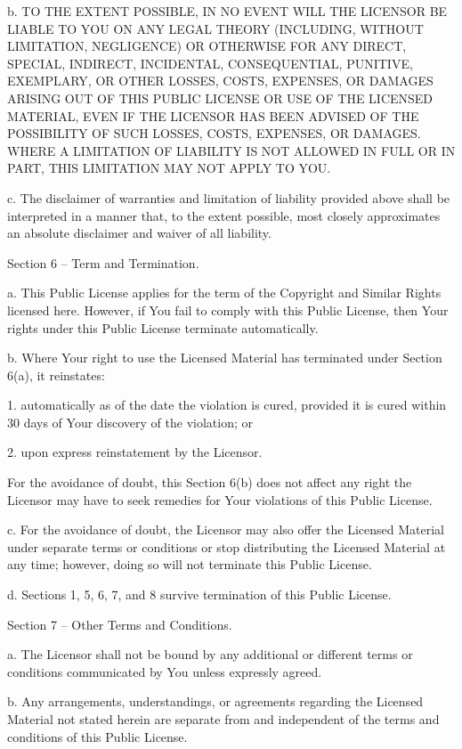   b. TO THE EXTENT POSSIBLE, IN NO EVENT WILL THE LICENSOR BE LIABLE
     TO YOU ON ANY LEGAL THEORY (INCLUDING, WITHOUT LIMITATION,
     NEGLIGENCE) OR OTHERWISE FOR ANY DIRECT, SPECIAL, INDIRECT,
     INCIDENTAL, CONSEQUENTIAL, PUNITIVE, EXEMPLARY, OR OTHER LOSSES,
     COSTS, EXPENSES, OR DAMAGES ARISING OUT OF THIS PUBLIC LICENSE OR
     USE OF THE LICENSED MATERIAL, EVEN IF THE LICENSOR HAS BEEN
     ADVISED OF THE POSSIBILITY OF SUCH LOSSES, COSTS, EXPENSES, OR
     DAMAGES. WHERE A LIMITATION OF LIABILITY IS NOT ALLOWED IN FULL OR
     IN PART, THIS LIMITATION MAY NOT APPLY TO YOU.

  c. The disclaimer of warranties and limitation of liability provided
     above shall be interpreted in a manner that, to the extent
     possible, most closely approximates an absolute disclaimer and
     waiver of all liability.


Section 6 -- Term and Termination.

  a. This Public License applies for the term of the Copyright and
     Similar Rights licensed here. However, if You fail to comply with
     this Public License, then Your rights under this Public License
     terminate automatically.

  b. Where Your right to use the Licensed Material has terminated under
     Section 6(a), it reinstates:

       1. automatically as of the date the violation is cured, provided
          it is cured within 30 days of Your discovery of the
          violation; or

       2. upon express reinstatement by the Licensor.

     For the avoidance of doubt, this Section 6(b) does not affect any
     right the Licensor may have to seek remedies for Your violations
     of this Public License.

  c. For the avoidance of doubt, the Licensor may also offer the
     Licensed Material under separate terms or conditions or stop
     distributing the Licensed Material at any time; however, doing so
     will not terminate this Public License.

  d. Sections 1, 5, 6, 7, and 8 survive termination of this Public
     License.


Section 7 -- Other Terms and Conditions.

  a. The Licensor shall not be bound by any additional or different
     terms or conditions communicated by You unless expressly agreed.

  b. Any arrangements, understandings, or agreements regarding the
     Licensed Material not stated herein are separate from and
     independent of the terms and conditions of this Public License.


